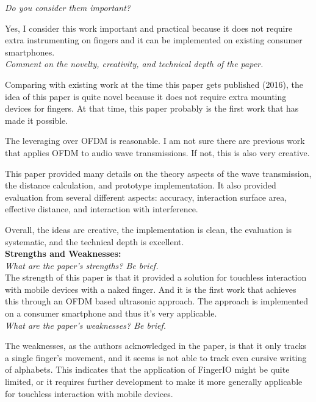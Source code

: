 \documentclass[11pt, oneside]{article}   	%
\begin{document}
\noindent \emph{Do you consider them important?}

Yes, I consider this work important and practical because it does not require extra instrumenting on fingers and it can be implemented on existing consumer smartphones.\\

\noindent \emph{Comment on the novelty, creativity, and technical depth of the paper.}

Comparing with existing work at the time this paper gets published (2016), the idea of this paper is quite novel because it does not require extra mounting devices for fingers. At that time, this paper probably is the first work that has made it possible.

The leveraging over OFDM is reasonable. I am not sure there are previous work that applies OFDM to audio wave transmissions. If not, this is also very creative.

This paper provided many details on the theory aspects of the wave transmission, the distance calculation, and prototype implementation. It also provided evaluation from several different aspects: accuracy, interaction surface area, effective distance, and interaction with interference.

Overall, the ideas are creative, the implementation is clean, the evaluation is systematic, and the technical depth is excellent.\\

\noindent \textbf{Strengths and Weaknesses:}\\
\emph{What are the paper’s strengths? Be brief.}\\

The strength of this paper is that it provided a solution for touchless interaction with mobile devices with a naked finger. And it is the first work that achieves this through an OFDM based ultrasonic approach. The approach is implemented on a consumer smartphone and thus it's very applicable.
\\

\noindent \emph{What are the paper's weaknesses? Be brief.}

The weaknesses, as the authors acknowledged in the paper, is that it only tracks a single finger's movement, and it seems is not able to track even cursive writing of alphabets. This indicates that the application of FingerIO might be quite limited, or it requires further development to make it more generally applicable for touchless interaction with mobile devices. \\
\end{document}
